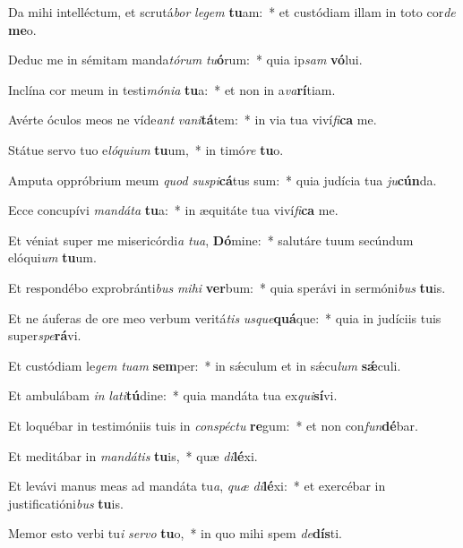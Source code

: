 \item Da mihi intelléctum, et scrutá\textit{bor} \textit{le}\textit{gem} \textbf{tu}am:~* et custódiam illam in toto cor\textit{de} \textbf{me}o.
\item Deduc me in sémitam manda\textit{tó}\textit{rum} \textit{tu}\textbf{ó}rum:~* quia ip\textit{sam} \textbf{vó}lui.
\item Inclína cor meum in testi\textit{mó}\textit{ni}\textit{a} \textbf{tu}a:~* et non in a\textit{va}\textbf{rí}tiam.
\item Avérte óculos meos ne víde\textit{ant} \textit{va}\textit{ni}\textbf{tá}tem:~* in via tua viví\textit{fi}\textbf{ca} me.
\item Státue servo tuo e\textit{ló}\textit{qui}\textit{um} \textbf{tu}um,~* in timó\textit{re} \textbf{tu}o.
\item Amputa oppróbrium meum \textit{quod} \textit{su}\textit{spi}\textbf{cá}tus sum:~* quia judícia tua \textit{ju}\textbf{cún}da.
\item Ecce concupívi \textit{man}\textit{dá}\textit{ta} \textbf{tu}a:~* in æquitáte tua viví\textit{fi}\textbf{ca} me.
\item Et véniat super me misericórdi\textit{a} \textit{tu}\textit{a}, \textbf{Dó}mine:~* salutáre tuum secúndum elóqui\textit{um} \textbf{tu}um.
\item Et respondébo exprobránti\textit{bus} \textit{mi}\textit{hi} \textbf{ver}bum:~* quia sperávi in sermóni\textit{bus} \textbf{tu}is.
\item Et ne áuferas de ore meo verbum veritá\textit{tis} \textit{us}\textit{que}\textbf{quá}que:~* quia in judíciis tuis super\textit{spe}\textbf{rá}vi.
\item Et custódiam le\textit{gem} \textit{tu}\textit{am} \textbf{sem}per:~* in sǽculum et in sǽcu\textit{lum} \textbf{sǽ}culi.
\item Et ambulábam \textit{in} \textit{la}\textit{ti}\textbf{tú}dine:~* quia mandáta tua ex\textit{qui}\textbf{sí}vi.
\item Et loquébar in testimóniis tuis in \textit{con}\textit{spéc}\textit{tu} \textbf{re}gum:~* et non con\textit{fun}\textbf{dé}bar.
\item Et meditábar in \textit{man}\textit{dá}\textit{tis} \textbf{tu}is,~* quæ \textit{di}\textbf{lé}xi.
\item Et levávi manus meas ad mandáta tu\textit{a}, \textit{quæ} \textit{di}\textbf{lé}xi:~* et exercébar in justificatióni\textit{bus} \textbf{tu}is.
\item Memor esto verbi tu\textit{i} \textit{ser}\textit{vo} \textbf{tu}o,~* in quo mihi spem \textit{de}\textbf{dís}ti.

